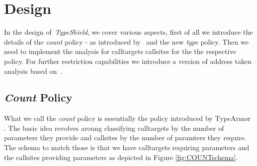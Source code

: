 \makeatletter
\providecommand{\bigsqcap}{%
  \mathop{%
    \mathpalette\@updown\bigsqcup
  }%
}
\newcommand*{\@updown}[2]{%
  \rotatebox[origin=c]{180}{$\m@th#1#2$}%
}
\makeatother

\makeatletter
\let\oldnl\nl%
\newcommand{\nonl}{\renewcommand{\nl}{\let\nl\oldnl}}%
\makeatother

\let\oldalgorithm\algorithm
\let\oldendalgorithm\endalgorithm

  \let\algorithm\figure
  \let\endalgorithm\endfigure

\chapter{Design}
\label{chapter:Design}

In the design of~\textit{TypeShield}, we cover various aspects, first of all we introduce the details of the 
\emph{count} policy - as introduced by~\cite{veen:typearmor} and the new \emph{type} policy. 
Then we need to implement the analysis for calltargets callsites for the the respective policy. 
For further restriction capabilities we introduce a version of address taken analysis based on~\cite{mingwei:sekar}. 

\section{\emph{Count} Policy}
\label{section:countpolicy}

What we call the \emph{count} policy is essentially the policy introduced by TypeArmor \cite{veen:typearmor}. 
The basic idea revolves aroung classifying calltargets by the number of parameters they provide and callsites 
by the number of paramters they require. The schema to match those is that we have calltargets requiring 
parameters and the callsites providing parameters as depicted in Figure \ref{fig:COUNTschema}.

